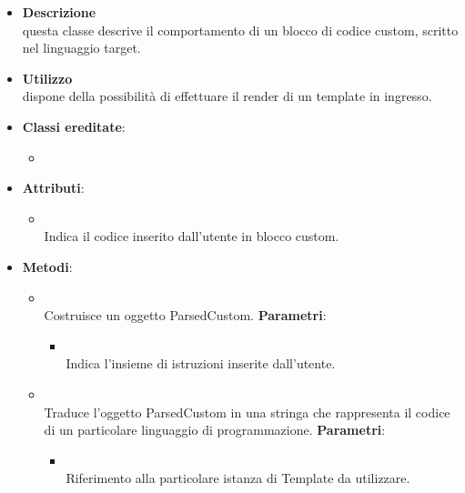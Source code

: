 \label{\nogloxy{swedesigner::server::project::ParsedCustom}}
\begin{figure}[h]
\centering
{}
\caption{}
\end{figure}
\FloatBarrier
\begin{itemize}
\item \textbf{Descrizione}\\
questa classe descrive il comportamento di un blocco di codice custom, scritto nel linguaggio target.	
\item \textbf{Utilizzo}\\
dispone della possibilità di effettuare il render di un template in ingresso.
\item \textbf{Classi ereditate}:
\begin{itemize}
\item \hyperref[\nogloxy{swedesigner::server::project::ParsedInstruction}]{}
\end{itemize}
\item \textbf{Attributi}:
\begin{itemize}
\item {}
\\ Indica il codice inserito dall'utente in blocco custom.
\end{itemize}
\item \textbf{Metodi}:
\begin{itemize}
\item {}
\\ Costruisce un oggetto ParsedCustom.
\textbf{Parametri}:
\begin{itemize}
\item {}
\\ Indica l'insieme di istruzioni inserite dall'utente.
\end{itemize}
\item {}
\\ Traduce l'oggetto ParsedCustom in una stringa che rappresenta il codice di un particolare linguaggio di programmazione.
\textbf{Parametri}:
\begin{itemize}
\item {}
\\ Riferimento alla particolare istanza di Template da utilizzare.
\end{itemize}
\end{itemize}
\end{itemize}

